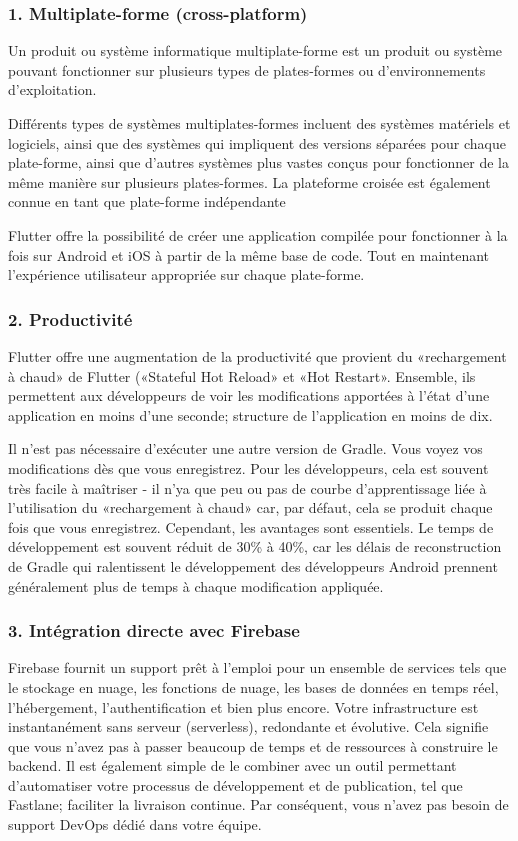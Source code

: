 \subsubsection{1. Multiplate-forme (cross-platform)}
Un produit ou système informatique multiplate-forme est un produit ou système pouvant fonctionner sur plusieurs types de plates-formes ou d'environnements d'exploitation.

Différents types de systèmes multiplates-formes incluent des systèmes matériels et logiciels, ainsi que des systèmes qui impliquent des versions séparées pour chaque plate-forme, ainsi que d'autres systèmes plus vastes conçus pour fonctionner de la même manière sur plusieurs plates-formes.
La plateforme croisée est également connue en tant que plate-forme indépendante\cite{noauthor_what_nodate}

Flutter offre la possibilité de créer une application compilée pour fonctionner à la fois sur Android et iOS à partir de la même base de code. Tout en maintenant l'expérience utilisateur appropriée sur chaque plate-forme.


\subsubsection{2. Productivité}
Flutter offre une augmentation de la productivité que provient du «rechargement à chaud» de Flutter («Stateful Hot Reload» et «Hot Restart». Ensemble, ils permettent aux développeurs de voir les modifications apportées à l'état d'une application en moins d'une seconde; structure de l'application en moins de dix.

Il n’est pas nécessaire d’exécuter une autre version de Gradle. Vous voyez vos modifications dès que vous enregistrez. Pour les développeurs, cela est souvent très facile à maîtriser - il n’ya que peu ou pas de courbe d’apprentissage liée à l’utilisation du «rechargement à chaud» car, par défaut, cela se produit chaque fois que vous enregistrez. Cependant, les avantages sont essentiels. Le temps de développement est souvent réduit de 30\% à 40\%, car les délais de reconstruction de Gradle qui ralentissent le développement des développeurs Android prennent généralement plus de temps à chaque modification appliquée.

\subsubsection{3. Intégration directe avec Firebase}
Firebase fournit un support prêt à l'emploi pour un ensemble de services tels que le stockage en nuage, les fonctions de nuage, les bases de données en temps réel, l'hébergement, l'authentification et bien plus encore. Votre infrastructure est instantanément sans serveur (\gls{serverless}), redondante et évolutive. Cela signifie que vous n’avez pas à passer beaucoup de temps et de ressources à construire le backend. Il est également simple de le combiner avec un outil permettant d’automatiser votre processus de développement et de publication, tel que Fastlane; faciliter la livraison continue. Par conséquent, vous n'avez pas besoin de support DevOps dédié dans votre équipe.

